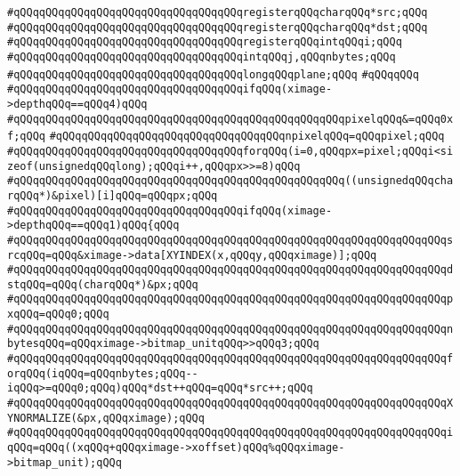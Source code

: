 \verb|#qQQqqQQqqQQqqQQqqQQqqQQqqQQqqQQqqQQqregisterqQQqcharqQQq*src;qQQq|\newline
\verb|#qQQqqQQqqQQqqQQqqQQqqQQqqQQqqQQqqQQqregisterqQQqcharqQQq*dst;qQQq|\newline
\verb|#qQQqqQQqqQQqqQQqqQQqqQQqqQQqqQQqqQQqregisterqQQqintqQQqi;qQQq|\newline
\verb|#qQQqqQQqqQQqqQQqqQQqqQQqqQQqqQQqqQQqintqQQqj,qQQqnbytes;qQQq|\newline
\verb|#qQQqqQQqqQQqqQQqqQQqqQQqqQQqqQQqqQQqlongqQQqplane;qQQq|\newline
\verb|#qQQqqQQq|\newline
\verb|#qQQqqQQqqQQqqQQqqQQqqQQqqQQqqQQqqQQqifqQQq(ximage->depthqQQq==qQQq4)qQQq|\newline
\verb|#qQQqqQQqqQQqqQQqqQQqqQQqqQQqqQQqqQQqqQQqqQQqqQQqqQQqpixelqQQq&=qQQq0xf;qQQq|\newline
\verb|#qQQqqQQqqQQqqQQqqQQqqQQqqQQqqQQqqQQqnpixelqQQq=qQQqpixel;qQQq|\newline
\verb|#qQQqqQQqqQQqqQQqqQQqqQQqqQQqqQQqqQQqforqQQq(i=0,qQQqpx=pixel;qQQqi<sizeof(unsignedqQQqlong);qQQqi++,qQQqpx>>=8)qQQq|\newline
\verb|#qQQqqQQqqQQqqQQqqQQqqQQqqQQqqQQqqQQqqQQqqQQqqQQqqQQq((unsignedqQQqcharqQQq*)&pixel)[i]qQQq=qQQqpx;qQQq|\newline
\verb|#qQQqqQQqqQQqqQQqqQQqqQQqqQQqqQQqqQQqifqQQq(ximage->depthqQQq==qQQq1)qQQq{qQQq|\newline
\verb|#qQQqqQQqqQQqqQQqqQQqqQQqqQQqqQQqqQQqqQQqqQQqqQQqqQQqqQQqqQQqqQQqqQQqsrcqQQq=qQQq&ximage->data[XYINDEX(x,qQQqy,qQQqximage)];qQQq|\newline
\verb|#qQQqqQQqqQQqqQQqqQQqqQQqqQQqqQQqqQQqqQQqqQQqqQQqqQQqqQQqqQQqqQQqqQQqdstqQQq=qQQq(charqQQq*)&px;qQQq|\newline
\verb|#qQQqqQQqqQQqqQQqqQQqqQQqqQQqqQQqqQQqqQQqqQQqqQQqqQQqqQQqqQQqqQQqqQQqpxqQQq=qQQq0;qQQq|\newline
\verb|#qQQqqQQqqQQqqQQqqQQqqQQqqQQqqQQqqQQqqQQqqQQqqQQqqQQqqQQqqQQqqQQqqQQqnbytesqQQq=qQQqximage->bitmap_unitqQQq>>qQQq3;qQQq|\newline
\verb|#qQQqqQQqqQQqqQQqqQQqqQQqqQQqqQQqqQQqqQQqqQQqqQQqqQQqqQQqqQQqqQQqqQQqforqQQq(iqQQq=qQQqnbytes;qQQq--iqQQq>=qQQq0;qQQq)qQQq*dst++qQQq=qQQq*src++;qQQq|\newline
\verb|#qQQqqQQqqQQqqQQqqQQqqQQqqQQqqQQqqQQqqQQqqQQqqQQqqQQqqQQqqQQqqQQqqQQqXYNORMALIZE(&px,qQQqximage);qQQq|\newline
\verb|#qQQqqQQqqQQqqQQqqQQqqQQqqQQqqQQqqQQqqQQqqQQqqQQqqQQqqQQqqQQqqQQqqQQqiqQQq=qQQq((xqQQq+qQQqximage->xoffset)qQQq%qQQqximage->bitmap_unit);qQQq|\newline
